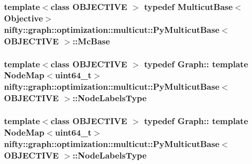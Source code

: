 \subsubsection[{Mc\+Base}]{\setlength{\rightskip}{0pt plus 5cm}template$<$class O\+B\+J\+E\+C\+T\+I\+V\+E $>$ typedef {\bf Multicut\+Base}$<${\bf Objective}$>$ {\bf nifty\+::graph\+::optimization\+::multicut\+::\+Py\+Multicut\+Base}$<$ O\+B\+J\+E\+C\+T\+I\+V\+E $>$\+::{\bf Mc\+Base}}\label{classnifty_1_1graph_1_1optimization_1_1multicut_1_1PyMulticutBase_a775b6ff9bccc9e60c99fc6b42e7dd82f}
\hypertarget{classnifty_1_1graph_1_1optimization_1_1multicut_1_1PyMulticutBase_a3fa8b01c434939d8187dc7b1515f4d81}{}
\subsubsection[{Node\+Labels\+Type}]{\setlength{\rightskip}{0pt plus 5cm}template$<$class O\+B\+J\+E\+C\+T\+I\+V\+E $>$ typedef Graph\+:: template Node\+Map$<$uint64\+\_\+t$>$ {\bf nifty\+::graph\+::optimization\+::multicut\+::\+Py\+Multicut\+Base}$<$ O\+B\+J\+E\+C\+T\+I\+V\+E $>$\+::{\bf Node\+Labels\+Type}}\label{classnifty_1_1graph_1_1optimization_1_1multicut_1_1PyMulticutBase_a3fa8b01c434939d8187dc7b1515f4d81}
\hypertarget{classnifty_1_1graph_1_1optimization_1_1multicut_1_1PyMulticutBase_a3fa8b01c434939d8187dc7b1515f4d81}{}
\subsubsection[{Node\+Labels\+Type}]{\setlength{\rightskip}{0pt plus 5cm}template$<$class O\+B\+J\+E\+C\+T\+I\+V\+E $>$ typedef Graph\+:: template Node\+Map$<$uint64\+\_\+t$>$ {\bf nifty\+::graph\+::optimization\+::multicut\+::\+Py\+Multicut\+Base}$<$ O\+B\+J\+E\+C\+T\+I\+V\+E $>$\+::{\bf Node\+Labels\+Type}}\label{classnifty_1_1graph_1_1optimization_1_1multicut_1_1PyMulticutBase_a3fa8b01c434939d8187dc7b1515f4d81}
\hypertarget{classnifty_1_1graph_1_1optimization_1_1multicut_1_1PyMulticutBase_a5cfc50491fd6d59375e8109cf77d832a}{}
